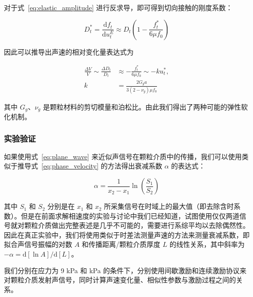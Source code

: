 对于式~\eqref{eq:elastic_amplitude} 进行反求导，即可得到切向接触的刚度系数：

\begin{equation}
  D_{t}^{*} = \frac{\mathrm{d}f_{t}}{\mathrm{d}u_{t}^{E}} \approx D_{t}\left(1 - \frac{f_{t}^{*}}{6\mu f_{0}}\right)
\end{equation}

因此可以推导出声速的相对变化量表达式为

\begin{align}
  \frac{\Delta V}{V}\sim \frac{\Delta D_{t}}{D_{t}} &\approx -\frac{f_{t}^{*}}{6\mu f_{0}} \sim -ku_{t}^{*},\\
  k &= \frac{2G_{g}a}{3(2-\nu_{g})\mu f_{0}}\label{eq:friction}
\end{align}

其中 $G_{g}$、$\nu_{g}$ 是颗粒材料的剪切模量和泊松比。由此我们得出了两种可能的弹性软化机制。

\subsubsection{实验验证}

如果使用式~\eqref{eq:plane_wave} 来近似声信号在颗粒介质中的传播，我们可以使用类似于推导式~\eqref{eq:phase_velocity} 的方法得出衰减系数 $\alpha$ 的表达式：

\begin{equation}
  \alpha = \frac{1}{x_{2}-x_{1}}\ln{\left(\frac{S_{1}}{S_{2}}\right)}
\end{equation}

其中 $S_{1}$ 和 $S_{2}$ 分别是在 $x_{1}$ 和 $x_{2}$ 所采集信号在时域上的最大值（即去除含时系数）。但是在前面求解相速度的实验与讨论中我们已经知道，试图使用仅仅两道信号就对颗粒介质做出完整表述是几乎不可能的，需要进行系综平均以去除偶然性。因此在真正实验中，我们将使用类似于时差法测量声速的方法来测量衰减系数，即拟合声信号振幅的对数 $A$ 和传播距离/颗粒介质厚度 $L$ 的线性关系，其中斜率为 $-\alpha = \mathrm{d}[\ln{A}]/\mathrm{d}[L]$。

我们分别在应力为 9 \unit{\kilo\pascal} 和 \unit{\kilo\pascal} 的条件下，分别使用间歇激励和连续激励协议来对颗粒介质发射声信号，同时计算声速变化量、相似性参数与激励过程之间的关系。